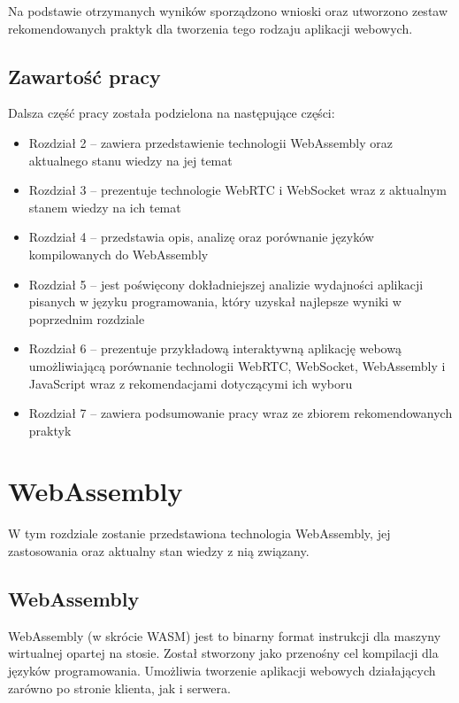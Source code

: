 \documentclass[language=polish,type=master]{aghmodern}
\begin{document}
Na podstawie otrzymanych wyników sporządzono wnioski oraz utworzono zestaw rekomendowanych praktyk dla tworzenia tego rodzaju aplikacji webowych.

\section{Zawartość pracy}
Dalsza część pracy została podzielona na następujące części:

\begin{itemize}
    \item Rozdział 2 -- zawiera przedstawienie technologii WebAssembly oraz aktualnego stanu wiedzy na jej temat
    \item Rozdział 3 -- prezentuje technologie WebRTC i WebSocket wraz z aktualnym stanem wiedzy na ich temat
    \item Rozdział 4 -- przedstawia opis, analizę oraz porównanie języków kompilowanych do WebAssembly
    \item Rozdział 5 -- jest poświęcony dokładniejszej analizie wydajności aplikacji pisanych w języku programowania, który uzyskał najlepsze wyniki w poprzednim rozdziale
    \item Rozdział 6 -- prezentuje przykładową interaktywną aplikację webową umożliwiającą porównanie technologii WebRTC, WebSocket, WebAssembly i JavaScript wraz z rekomendacjami dotyczącymi ich wyboru
    \item Rozdział 7 -- zawiera podsumowanie pracy wraz ze zbiorem rekomendowanych praktyk
\end{itemize}

\chapter{WebAssembly}
W tym rozdziale zostanie przedstawiona technologia WebAssembly, jej zastosowania oraz aktualny stan wiedzy z nią związany.

\section{WebAssembly}
WebAssembly (w skrócie WASM) jest to binarny format instrukcji dla maszyny wirtualnej opartej na stosie.
Został stworzony jako przenośny cel kompilacji dla języków programowania\footnotemark{}.
Umożliwia tworzenie aplikacji webowych działających zarówno po stronie klienta, jak i serwera.
\end{document}
